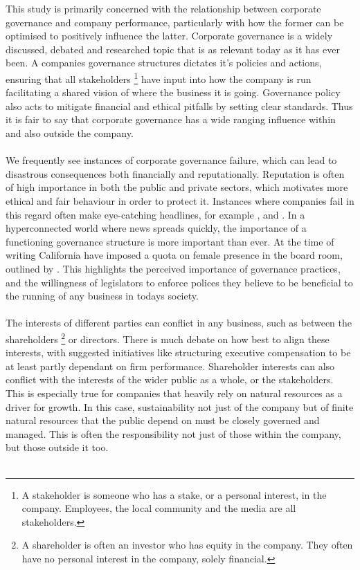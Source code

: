 {This study is primarily concerned with the relationship between corporate governance and company performance, particularly with how the former can be optimised to positively influence the latter. Corporate governance is a widely discussed, debated and researched topic that is as relevant today as it has ever been. A companies governance structures dictates it's policies and actions, ensuring that all stakeholders \footnote{A stakeholder is someone who has a stake, or a personal interest, in the company. Employees, the local community and the media are all stakeholders.} have input into how the company is run facilitating a shared vision of where the business it is going. Governance policy also acts to mitigate financial and ethical pitfalls by setting clear standards. Thus it is fair to say that corporate governance has a wide ranging influence within and also outside the company.\\\\
We frequently see instances of corporate governance failure, which can lead to disastrous consequences both financially and reputationally. Reputation is often of high importance in both the public and private sectors, which motivates more ethical and fair behaviour in order to protect it. Instances where companies fail in this regard often make eye-catching  headlines, for example \cite{kirkpatrick2009corporate}, \cite{telegraphVolkswagon} and \cite{cnnUnitedAirlines}. In a hyperconnected world where news spreads quickly, the importance of a functioning governance structure is more important than ever. At the time of writing California have imposed a quota on female presence in the board room, outlined by \cite{ftWomenBd}. This highlights the perceived importance of governance practices, and the willingness of legislators to enforce polices they believe to be beneficial to the running of any business in todays society.\\\\
The interests of different parties can conflict in any business, such as between the shareholders \footnote{A shareholder is often an investor who has equity in the company. They often have no personal interest in the company, solely financial.} or directors. There is much debate on how best to align these interests, with suggested initiatives like structuring executive compensation to be at least partly dependant on firm performance. Shareholder interests can also conflict with the interests of the wider public as a whole, or the stakeholders. This is especially true for companies that heavily rely on natural resources as a driver for growth. In this case, sustainability not just of the company but of finite natural resources that the public depend on must be closely governed and managed. This is often the responsibility not just of those within the company, but those outside it too.  \\\\
}

